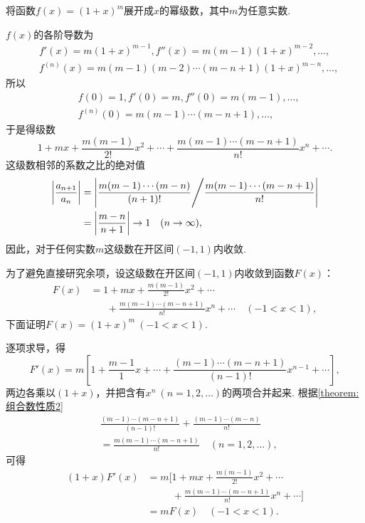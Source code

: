 \begin{example}
将函数\(f(x) = (1+x)^m\)展开成\(x\)的幂级数，其中\(m\)为任意实数.
\begin{solution}
\(f(x)\)的各阶导数为\begin{align*}
	&f'(x) = m (1+x)^{m-1},
	f''(x) = m(m-1) (1+x)^{m-2},
	\dotsc, \\
	&f^{(n)}(x) = m(m-1)(m-2)\dotsm(m-n+1) (1+x)^{m-n},
	\dotsc,
\end{align*}
所以\begin{align*}
	&f(0) = 1,
	f'(0) = m,
	f''(0) = m(m-1),
	\dotsc, \\
	&f^{(n)}(0) = m(m-1)\dotsm(m-n+1),\dotsc,
\end{align*}
于是得级数\[
	1+mx+\frac{m(m-1)}{2!}x^2+\dotsb+\frac{m(m-1)\dotsm(m-n+1)}{n!}x^n+\dotsb.
\]
这级数相邻的系数之比的绝对值\begin{align*}
	\abs{\frac{a_{n+1}}{a_n}}
	&= \abs{ \frac{m(m-1)\dotsm(m-n)}{(n+1)!} \Bigg/ \frac{m(m-1)\dotsm(m-n+1)}{n!} } \\
	&= \abs{ \frac{m-n}{n+1} }
	\to 1 \quad(n\to\infty),
\end{align*}
因此，对于任何实数\(m\)这级数在开区间\((-1,1)\)内收敛.

为了避免直接研究余项，设这级数在开区间\((-1,1)\)内收敛到函数\(F(x)\)：\begin{align*}
	F(x)
	&= 1+mx+\frac{m(m-1)}{2!}x^2+\dotsb \\
	&\hspace{20pt}+\frac{m(m-1)\dotsm(m-n+1)}{n!}x^n+\dotsb
	\quad(-1<x<1),
\end{align*}
下面证明\(F(x) = (1+x)^m\ (-1<x<1)\).

逐项求导，得\[
	F'(x) = m \left[
		1+\frac{m-1}{1}x+\dotsb+\frac{(m-1)\dotsm(m-n+1)}{(n-1)!}x^{n-1}+\dotsb
	\right],
\]
两边各乘以\((1+x)\)，并把含有\(x^n\ (n=1,2,\dotsc)\)的两项合并起来.
根据\cref{theorem:组合数性质2}
\begin{align*}
	&\frac{(m-1)\dotsm(m-n+1)}{(n-1)!}
		+ \frac{(m-1)\dotsm(m-n)}{n!} \\
	&= \frac{m(m-1)\dotsm(m-n+1)}{n!}
		\quad(n=1,2,\dotsc),
\end{align*}
可得\begin{align*}
	(1+x) F'(x)
	&= m \Biggl[
	1+mx+\frac{m(m-1)}{2!}x^2+\dotsb \\
	&\hspace{30pt} +\frac{m(m-1)\dotsm(m-n+1)}{n!}x^n+\dotsb
	\Biggr] \\
	&= m F(x)
	\quad(-1<x<1).
\end{align*}


\end{solution}
\end{example}
